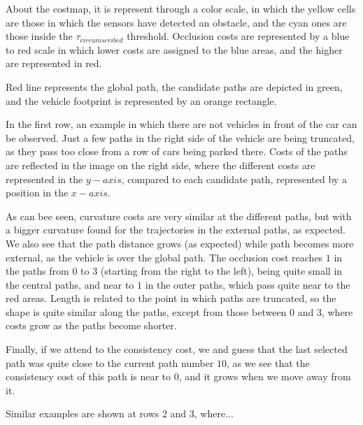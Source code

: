 About the costmap, it is represent through a color scale, in which the yellow cells are those in which the sensors have detected an obstacle, and the cyan ones are those inside the $\tau_{circumscribed}$ threshold. Occlusion costs are represented by a blue to red scale in which lower costs are assigned to the blue areas, and the higher are represented in red.

Red line represents the global path, the candidate paths are depicted in green, and the vehicle footprint is represented by an orange rectangle.

In the first row, an example in which there are not vehicles in front of the car can be observed. Just a few paths in the right side of the vehicle are being truncated, as they pass too close from a row of cars being parked there. Costs of the paths are reflected in the image on the right side, where the different costs are represented in the $y-axis$, compared to each candidate path, represented by a position in the $x-axis$. 

As can bee seen, curvature costs are very similar at the different paths, but with a bigger curvature found for the trajectories in the external paths, as expected. We also see that the path distance grows (as expected) while path becomes more external, as the vehicle is over the global path. The occlusion cost reaches $1$ in the paths from $0$ to $3$ (starting from the right to the left), being quite small in the central paths, and near to $1$ in the outer paths, which pass quite near to the red areas. Length is related to the point in which paths are truncated, so the shape is quite similar along the paths, except from those between $0$ and $3$, where costs grow as the paths become shorter.

Finally, if we attend to the consistency cost, we and guess that the last selected path was quite close to the current path number $10$, as we see that the consistency cost of this path is near to $0$, and it grows when we move away from it.

Similar examples are shown at rows 2 and 3, where...

